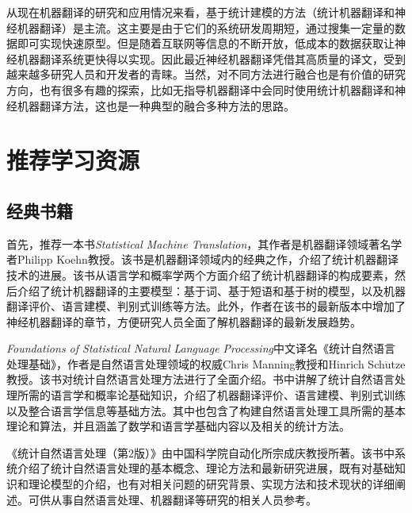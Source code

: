 \parinterval 从现在机器翻译的研究和应用情况来看，基于统计建模的方法（统计机器翻译和神经机器翻译）是主流。这主要是由于它们的系统研发周期短，通过搜集一定量的数据即可实现快速原型。但是随着互联网等信息的不断开放，低成本的数据获取让神经机器翻译系统更快得以实现。因此最近神经机器翻译凭借其高质量的译文，受到越来越多研究人员和开发者的青睐。当然，对不同方法进行融合也是有价值的研究方向，也有很多有趣的探索，比如无指导机器翻译中会同时使用统计机器翻译和神经机器翻译方法，这也是一种典型的融合多种方法的思路。


\sectionnewpage
\section{推荐学习资源}

\subsection{经典书籍}

\parinterval 首先，推荐一本书\emph{Statistical Machine Translation}，其作者是机器翻译领域著名学者Philipp Koehn教授。该书是机器翻译领域内的经典之作，介绍了统计机器翻译技术的进展。该书从语言学和概率学两个方面介绍了统计机器翻译的构成要素，然后介绍了统计机器翻译的主要模型：基于词、基于短语和基于树的模型，以及机器翻译评价、语言建模、判别式训练等方法。此外，作者在该书的最新版本中增加了神经机器翻译的章节，方便研究人员全面了解机器翻译的最新发展趋势。

\parinterval \emph{Foundations of Statistical Natural Language Processing}中文译名《统计自然语言处理基础》，作者是自然语言处理领域的权威Chris Manning教授和Hinrich Sch$\ddot{\textrm{u}}$tze教授。该书对统计自然语言处理方法进行了全面介绍。书中讲解了统计自然语言处理所需的语言学和概率论基础知识，介绍了机器翻译评价、语言建模、判别式训练以及整合语言学信息等基础方法。其中也包含了构建自然语言处理工具所需的基本理论和算法，并且涵盖了数学和语言学基础内容以及相关的统计方法。

\parinterval 《统计自然语言处理（第2版）》由中国科学院自动化所宗成庆教授所著。该书中系统介绍了统计自然语言处理的基本概念、理论方法和最新研究进展，既有对基础知识和理论模型的介绍，也有对相关问题的研究背景、实现方法和技术现状的详细阐述。可供从事自然语言处理、机器翻译等研究的相关人员参考。

